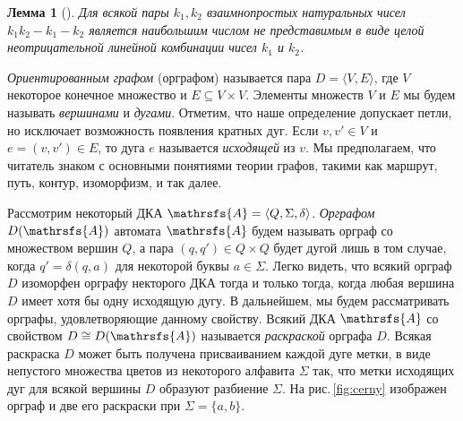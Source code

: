 \documentclass[11pt]{article}
\newtheorem{lemma}{Лемма}
\begin{document}

\begin{lemma}[{\mdseries\cite[Теорема 2.1.1]{RaAl05}}]
\label{sylvester}
Для всякой пары $k_1,k_2$ взаимнопростых натуральных чисел $k_1k_2-k_1-k_2$ является
наибольшим числом не представимым в виде целой неотрицательной линейной комбинации 
чисел $k_1$ и $k_2$.
\end{lemma}



\emph{Ориентированным графом} (орграфом) называется пара $D=\langle V,E\rangle$,
где $V$ некоторое конечное множество и $E\subseteq V\times V$. 
Элементы множеств $V$ и $E$ мы будем называть \emph{вершинами} и \emph{дугами}. 
Отметим, что наше определение допускает петли, но исключает возможность появления
кратных дуг. Если $v,v'\in V$ и $e=(v,v')\in E$, то дуга $e$ называется
\emph{исходящей} из $v$. Мы предполагаем, что читатель знаком с основными понятиями
теории графов, такими как маршрут,
путь, контур, изоморфизм, и так далее.



Рассмотрим некоторый ДКА $\mathrsfs{A}=\langle Q,\Sigma,\delta\rangle$.
\emph{Орграфом} $D(\mathrsfs{A})$ автомата $\mathrsfs{A}$ будем 
называть орграф со множеством вершин $Q$, а пара $(q,q')\in Q\times Q$ будет 
дугой лишь в том случае, когда $q'=\delta(q,a)$ для некоторой буквы $a\in\Sigma$.
Легко видеть, что всякий орграф $D$ изоморфен орграфу некторого ДКА тогда и только тогда,
когда любая вершина $D$ имеет хотя бы одну исходящую дугу. В дальнейшем, мы будем 
рассматривать орграфы, удовлетворяющие данному свойству.  
Всякий ДКА $\mathrsfs{A}$ со свойством $D\cong D(\mathrsfs{A})$ называется
\emph{раскраской} орграфа $D$. Всякая раскраска $D$ может быть получена
присваиванием каждой дуге метки, в виде непустого множества цветов из некоторого алфавита $\Sigma$ так, 
что метки исходящих дуг для всякой вершины $D$ образуют разбиение $\Sigma$. На рис.\,\ref{fig:cerny} 
изображен орграф и две его раскраски при $\Sigma=\{a,b\}$.
\end{document}
